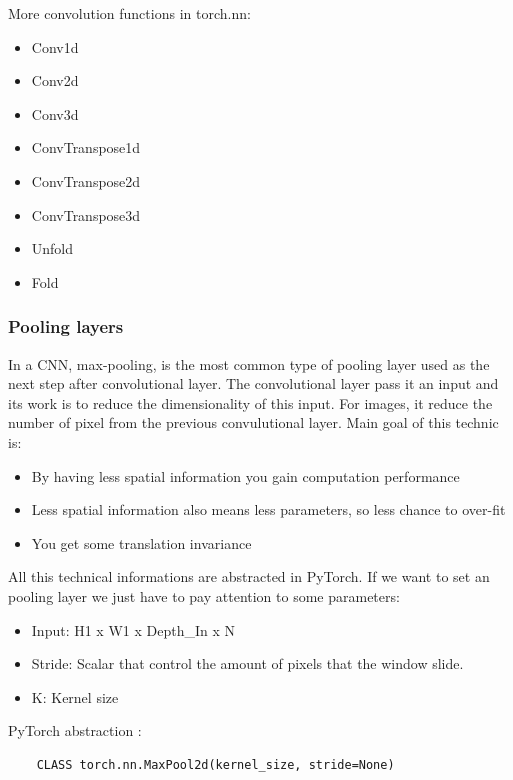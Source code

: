 More convolution functions in torch.nn:
\begin{itemize}
    \item Conv1d
    \item Conv2d
    \item Conv3d
    \item ConvTranspose1d
    \item ConvTranspose2d
    \item ConvTranspose3d
    \item Unfold
    \item Fold
\end{itemize}




\subsubsection{Pooling layers}
In a CNN, max-pooling, is the most common type of pooling layer used as the next step after convolutional layer. The convolutional layer pass it an input and its work is to reduce the dimensionality of this input. For images, it reduce the number of pixel from the previous convulutional layer. Main goal of this technic is:
\begin{itemize}
    \item By having less spatial information you gain computation performance
    \item Less spatial information also means less parameters, so less chance to over-fit
    \item You get some translation invariance
\end{itemize}

All this technical informations are abstracted in PyTorch. If we want to set an pooling layer we just have to pay attention to some parameters:
\begin{itemize}
    \item Input: H1 x W1 x Depth\_In x N
    \item Stride: Scalar that control the amount of pixels that the window slide.
    \item K: Kernel size
\end{itemize}

PyTorch abstraction :
\begin{lstlisting}
    CLASS torch.nn.MaxPool2d(kernel_size, stride=None)
\end{lstlisting}

